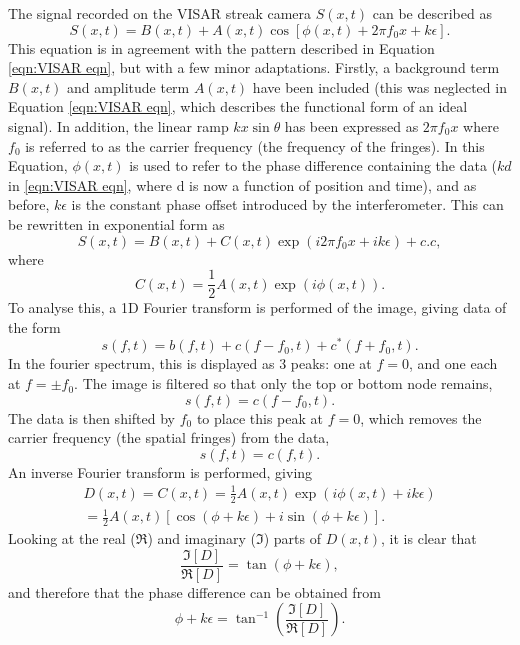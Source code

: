 The signal recorded on the VISAR streak camera $S(x,t)$ can be described as 
\begin{equation} S(x,t) = B(x,t) + A(x,t) \cos[ \phi (x,t) + 2\pi f_0 x + k\epsilon ]. \end{equation}
This equation is in agreement with the pattern described in Equation \ref{eqn:VISAR eqn}, but with a few minor adaptations. Firstly, a background term $B(x,t)$ and amplitude term $A(x,t)$ have been included (this was neglected in Equation \ref{eqn:VISAR eqn}, which describes the functional form of an ideal signal). In addition, the linear ramp $kx\sin\theta$ has been expressed as $2\pi f_0 x$ where $f_0$ is referred to as the carrier frequency (the frequency of the fringes). In this Equation, $\phi(x,t)$ is used to refer to the phase difference containing the data ($kd$ in \ref{eqn:VISAR eqn}, where d is now a function of position and time), and as before, $k\epsilon$ is the constant phase offset introduced by the interferometer. This can be rewritten in exponential form as 
\begin{equation} S(x,t) = B(x,t) + C(x,t) \exp(i2\pi f_0 x + ik\epsilon) + c.c, \end{equation} where 
\begin{equation} C(x,t) = \frac{1}{2} A(x,t) \exp(i\phi(x,t)). \end{equation}
To analyse this, a 1D Fourier transform is performed of the image, giving data of the form
\begin{equation} s(f,t) = b(f,t) + c(f - f_0,t) + c^{*}(f + f_0,t). \end{equation}
In the fourier spectrum, this is displayed as 3 peaks: one at $f=0$, and one each at $f = \pm f_0$. The image is filtered so that only the top or bottom node remains,
\begin{equation} s(f,t) = c(f - f_0,t). \end{equation}
The data is then shifted by $f_0$ to place this peak at $f=0$, which removes the carrier frequency (the spatial fringes) from the data,
\begin{equation} s(f,t) = c(f,t). \end{equation}
An inverse Fourier transform is performed, giving 
\begin{multline}  D(x,t) = C(x,t) = \frac{1}{2}A(x,t)\exp(i\phi(x,t) + ik\epsilon) \\ = \frac{1}{2}A(x,t)[\cos(\phi + k\epsilon) + i\sin(\phi + k\epsilon)].  \end{multline}
Looking at the real ($\Re$) and imaginary ($\Im$) parts of $D(x,t)$, it is clear that 
\begin{equation} \frac{\Im[D]}{\Re[D]} = \tan(\phi + k\epsilon), \end{equation}
and therefore that the phase difference can be obtained from 
\begin{equation} \phi + k\epsilon = \tan^{-1}(\frac{\Im[D]}{\Re[D]}). \end{equation}

